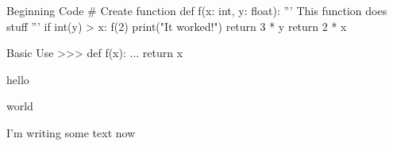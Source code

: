 

\lipsum[1]

\begin{codebox}{\linewidth}{Beginning Code}
# Create function
def f(x: int, y: float):
    '''
    This function does stuff
    '''
    if int(y) > x:
        f(2)
        print("It worked!")
        return 3 * y
    return 2 * x
\end{codebox}

\begin{pyshell}{\linewidth}{Basic Use}
>>> def f(x):
...     return x    
\end{pyshell}

\lipsum[2]


\lipsum[3]


\begin{list-triangle}
    \item hello
    \item world
\end{list-triangle}

I'm writing some text now